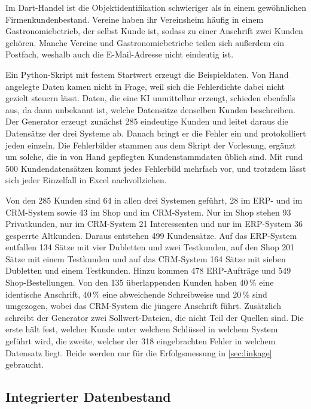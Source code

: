 \documentclass[a4paper,12pt]{article}
\begin{document}
Im Dart-Handel ist die Objektidentifikation schwieriger als in einem gewöhnlichen Firmenkundenbestand. Vereine haben ihr Vereinsheim häufig in einem Gastronomiebetrieb, der selbst Kunde ist, sodass zu einer Anschrift zwei Kunden gehören. Manche Vereine und Gastronomiebetriebe teilen sich außerdem ein Postfach, weshalb auch die E-Mail-Adresse nicht eindeutig ist.

Ein Python-Skript mit festem Startwert erzeugt die Beispieldaten. Von Hand angelegte Daten kamen nicht in Frage, weil sich die Fehlerdichte dabei nicht gezielt steuern lässt. Daten, die eine KI unmittelbar erzeugt, schieden ebenfalls aus, da dann unbekannt ist, welche Datensätze denselben Kunden beschreiben. Der Generator erzeugt zunächst 285 eindeutige Kunden und leitet daraus die Datensätze der drei Systeme ab. Danach bringt er die Fehler ein und protokolliert jeden einzeln. Die Fehlerbilder stammen aus dem Skript der Vorlesung, ergänzt um solche, die in von Hand gepflegten Kundenstammdaten üblich sind. Mit rund 500 Kundendatensätzen kommt jedes Fehlerbild mehrfach vor, und trotzdem lässt sich jeder Einzelfall in Excel nachvollziehen.

Von den 285 Kunden sind 64 in allen drei Systemen geführt, 28 im ERP- und im CRM-System sowie 43 im Shop und im CRM-System. Nur im Shop stehen 93 Privatkunden, nur im CRM-System 21 Interessenten und nur im ERP-System 36 gesperrte Altkunden. Daraus entstehen 499 Kundensätze. Auf das ERP-System entfallen 134 Sätze mit vier Dubletten und zwei Testkunden, auf den Shop 201 Sätze mit einem Testkunden und auf das CRM-System 164 Sätze mit sieben Dubletten und einem Testkunden. Hinzu kommen 478 ERP-Aufträge und 549 Shop-Bestellungen. Von den 135 überlappenden Kunden haben 40\,\% eine identische Anschrift, 40\,\% eine abweichende Schreibweise und 20\,\% sind umgezogen, wobei das CRM-System die jüngere Anschrift führt. Zusätzlich schreibt der Generator zwei Sollwert-Dateien, die nicht Teil der Quellen sind. Die erste hält fest, welcher Kunde unter welchem Schlüssel in welchem System geführt wird, die zweite, welcher der 318 eingebrachten Fehler in welchem Datensatz liegt. Beide werden nur für die Erfolgsmessung in \cref{sec:linkage} gebraucht.

\subsection{Integrierter Datenbestand}\label{sec:zielschema}
\end{document}
